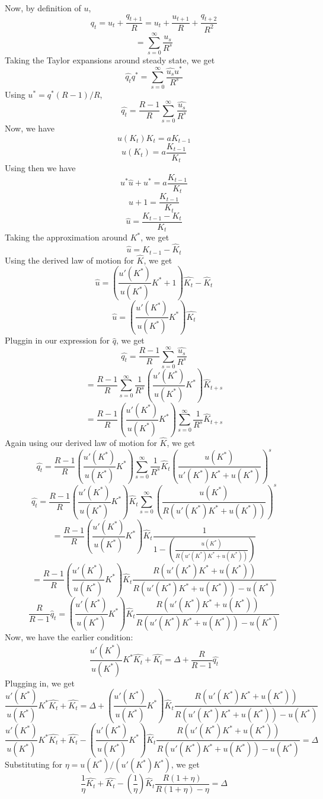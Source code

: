 \documentclass[10pt,letter]{article}
\begin{document}
Now, by definition of $u$,
\[ q_t = u_t + \frac{q_{t+1}}{R} = u_t + \frac{u_{t+1}}{R} + \frac{q_{t+2}}{R^2}\]
\[ = \sum_{s = 0}^\infty \frac{u_s}{R^s} \]
Taking the Taylor expansions around steady state, we get
\[ \hat{q_t}q^*= \sum_{s = 0}^\infty \frac{\hat{u_s}u^*}{R^s} \]
Using $u^* = q^*(R-1)/R$,
\[ \hat{q_t}= \frac{R-1}{R}\sum_{s = 0}^\infty \frac{\hat{u_s}}{R^s} \]
Now, we have
\[ u(K_t)K_t = aK_{t-1} \]
\[ u(K_t) = a\frac{K_{t-1}}{K_t} \]
Using then we have
\[ u^*\hat{u} + u^* = a\frac{K_{t-1}}{K_t} \]
\[ \hat{u} + 1 = \frac{K_{t-1}}{K_t} \]
\[ \hat{u}  = \frac{K_{t-1} - K_t}{K_t} \]
Taking the approximation around $K^*$, we get
\[ \hat{u}  = \hat{K}_{t-1} - \hat{K}_t \]
Using the derived law of motion for $\hat{K}$, we get
\[ \hat{u}  = \left(\frac{u'(K^*)}{u(K^*)}K^* + 1 \right)\hat{K_t} - \hat{K}_t \]
\[ \hat{u}  = \left(\frac{u'(K^*)}{u(K^*)}K^* \right)\hat{K_t}  \]
Pluggin in our expression for $\hat{q}$, we get
\[ \hat{q_t}= \frac{R-1}{R}\sum_{s = 0}^\infty \frac{\hat{u_s}}{R^s} \]
\[ = \frac{R-1}{R}\sum_{s = 0}^\infty \frac{1}{R^s}\left(\frac{u'(K^*)}{u(K^*)}K^* \right)\hat{K}_{t+s}  \]
\[ = \frac{R-1}{R}\left(\frac{u'(K^*)}{u(K^*)}K^* \right)\sum_{s = 0}^\infty \frac{1}{R^s}\hat{K}_{t+s}  \]
Again using our derived law of motion for $\hat{K}$, we get
\[ \hat{q_t} = \frac{R-1}{R}\left(\frac{u'(K^*)}{u(K^*)}K^* \right)\sum_{s = 0}^\infty \frac{1}{R^s}\hat{K}_{t}\left(\frac{u(K^*)}{u'(K^*)K^* + u(K^*)} \right)^s  \]
\[ \hat{q_t} = \frac{R-1}{R}\left(\frac{u'(K^*)}{u(K^*)}K^* \right)\hat{K}_{t}\sum_{s = 0}^\infty \left(\frac{u(K^*)}{R(u'(K^*)K^* + u(K^*))} \right)^s  \]
\[ = \frac{R-1}{R}\left(\frac{u'(K^*)}{u(K^*)}K^* \right)\hat{K}_{t} \frac{1}{1-\left(\frac{u(K^*)}{R(u'(K^*)K^* + u(K^*))} \right)}  \]
\[ = \frac{R-1}{R}\left(\frac{u'(K^*)}{u(K^*)}K^* \right)\hat{K}_{t} \frac{R(u'(K^*)K^* + u(K^*))}{R(u'(K^*)K^* + u(K^*))-u(K^*) }  \]
\[ \frac{R}{R-1}\hat{q}_t = \left(\frac{u'(K^*)}{u(K^*)}K^* \right)\hat{K}_{t} \frac{R(u'(K^*)K^* + u(K^*))}{R(u'(K^*)K^* + u(K^*))-u(K^*) } \]
Now, we have the earlier condition:
\[ \frac{u'(K^*)}{u(K^*)} K^*\hat{K_t} + \hat{K_t} = \Delta + \frac{R}{R-1}\hat{q_t} \]
Plugging in, we get
\[ \frac{u'(K^*)}{u(K^*)} K^*\hat{K_t} + \hat{K_t} = \Delta + \left(\frac{u'(K^*)}{u(K^*)}K^* \right)\hat{K}_{t} \frac{R(u'(K^*)K^* + u(K^*))}{R(u'(K^*)K^* + u(K^*))-u(K^*) }\]
\[ \frac{u'(K^*)}{u(K^*)} K^*\hat{K_t} + \hat{K_t}-  \left(\frac{u'(K^*)}{u(K^*)}K^* \right)\hat{K}_{t} \frac{R(u'(K^*)K^* + u(K^*))}{R(u'(K^*)K^* + u(K^*))-u(K^*) } = \Delta \]
Substituting for $\eta = u(K^*)/(u'(K^*)K^*)$, we get
\[ \frac{1}{\eta} \hat{K_t} + \hat{K_t} -  \left(\frac{1}{\eta} \right)\hat{K}_{t} \frac{R(1 + \eta)}{R(1 + \eta)-\eta } = \Delta \]
\end{document}
